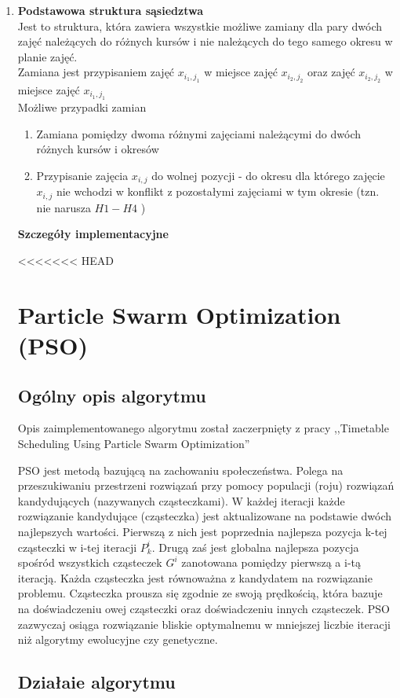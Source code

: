 \documentclass[11pt]{report}
\begin{document}
\begin{enumerate}
\item \textbf{Podstawowa struktura sąsiedztwa} \\
Jest to struktura, która zawiera wszystkie możliwe zamiany dla pary dwóch zajęć należących do różnych kursów i nie należących do tego samego okresu w planie zajęć. \\
Zamiana jest przypisaniem zajęć $x_{i_{1},j_{1}}$ w miejsce zajęć ${x_{i_{2}, j_{2}}}$ oraz zajęć ${x_{i_{2}, j_{2}}}$ w miejsce zajęć $x_{i_{1},j_{1}}$ \\
Możliwe przypadki zamian
\begin{enumerate}
\item Zamiana pomiędzy dwoma różnymi zajęciami należącymi do dwóch różnych kursów i okresów
\item Przypisanie zajęcia ${x_{i,j}}$ do wolnej pozycji - do okresu dla którego zajęcie ${x_{i,j}}$ nie wchodzi w konflikt z pozostałymi zajęciami w tym okresie (tzn. nie narusza ${H1-H4}$ )
\end{enumerate}
\textbf{Szczegóły implementacyjne}


<<<<<<< HEAD
\section{Particle Swarm Optimization (PSO)}
\subsection{Ogólny opis algorytmu}
\par Opis zaimplementowanego algorytmu został zaczerpnięty z pracy ,,Timetable Scheduling Using Particle Swarm Optimization'' \cite{pso}
\par PSO jest metodą bazującą na zachowaniu społeczeństwa. Polega na przeszukiwaniu przestrzeni rozwiązań przy pomocy populacji (roju) rozwiązań kandydujących (nazywanych cząsteczkami). W każdej iteracji każde rozwiązanie kandydujące (cząsteczka) jest aktualizowane na podstawie dwóch najlepszych wartości. Pierwszą z nich jest poprzednia najlepsza pozycja k-tej cząsteczki w i-tej iteracji ${P}^{i}_{k}$. Drugą zaś jest globalna najlepsza pozycja spośród wszystkich cząsteczek ${G}^{i}$ zanotowana pomiędzy pierwszą a i-tą iteracją. Każda cząsteczka jest równoważna z kandydatem na rozwiązanie problemu. Cząsteczka prousza się zgodnie ze swoją prędkością, która bazuje na doświadczeniu owej cząsteczki oraz doświadczeniu innych cząsteczek. PSO zazwyczaj osiąga rozwiązanie bliskie optymalnemu w mniejszej liczbie iteracji niż algorytmy ewolucyjne czy genetyczne.  \subsection{Działaie algorytmu}

\end{enumerate}
\end{document}
